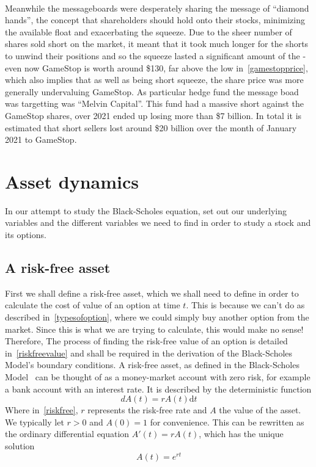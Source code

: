 \documentclass[11pt]{article} %
\begin{document}
\paragraph{}
Meanwhile the messageboards were desperately sharing the message of ``diamond hands'', 
the concept that shareholders should hold onto their stocks, minimizing the available 
float and exacerbating the squeeze. Due to the sheer number of shares sold short on 
the market, it meant that it took much longer for the shorts to unwind their positions 
and so the squeeze lasted a significant amount of the - even now GameStop is worth 
around \$130, far above the low in~\ref{gamestopprice}, which also implies that 
as well as being short squeeze, the share price was more generally undervaluing GameStop.
As particular hedge fund the message boad was targetting was ``Melvin Capital''. This 
fund had a massive short against the GameStop shares, over 2021 ended up losing more 
than \$7 billion. In total it is estimated that short sellers lost around \$20 billion 
over the month of January 2021 to GameStop.

\section{Asset dynamics}\label{assetdyamics}
In our attempt to study the Black-Scholes equation, set out our underlying variables 
and the different variables we need to find in order to study a stock and its options.

\subsection{A risk-free asset}
First we shall define a risk-free asset, which we shall need to define in order to 
calculate the cost of value of an option at time $t$. This is because we can't do 
as described in~\ref{typesofoption}, where we could simply buy another option from the 
market. Since this is what we are trying to calculate, this would make no sense! Therefore, 
The process of finding the risk-free value of an option is detailed in~\ref{riskfreevalue} 
and shall be required in the derivation of the Black-Scholes Model's boundary conditions.
A risk-free asset, as defined in the Black-Scholes Model~\cite{blackscholes} can be thought
of as a money-market account with zero risk, for example a bank account with an interest 
rate. It is described by the deterministic function 
\begin{equation} \label{riskfree}
    dA(t) = rA(t)\mathrm{d}t 
\end{equation}
Where in~\eqref{riskfree}, $r$ represents the risk-free rate and $A$ the value of the 
asset. We typically let $r>0$ and $A(0) = 1$ for convenience. This can be rewritten as 
the ordinary differential equation $A'(t) = rA(t)$, which has the unique solution 
\begin{equation} \label{riskfree solution}
    A(t) =e^{rt}
\end{equation}
\end{document}
